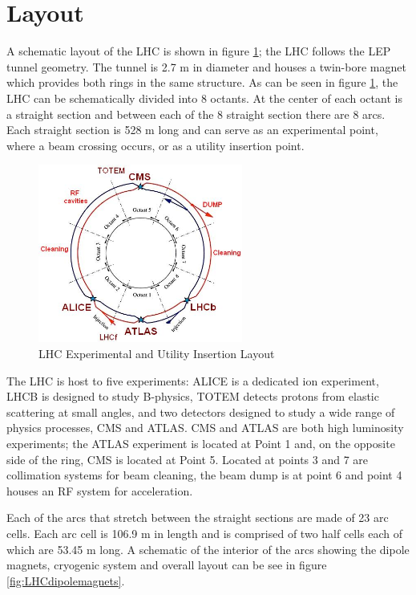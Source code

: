 \section{Layout}
A schematic layout of the LHC is shown in figure \ref{fig:LHCring};
the LHC follows the LEP tunnel geometry.
The tunnel is 2.7 m in diameter and houses a twin-bore magnet 
which provides both rings in the same structure.
As can be seen in figure \ref{fig:LHCring},
the LHC can be schematically divided 
into 8 octants. At the center of each octant is a straight section and between
each of the 8 straight section there are 8 arcs. Each straight section
is 528 m long and can serve as an experimental point, where a beam
crossing occurs, or as a utility insertion point.
\begin{figure}[t]
  \centering
	\includegraphics[width=0.6\textwidth]{images/LHCring.jpg}
  	\caption[LHCring]
   	{LHC Experimental and Utility Insertion Layout}
   \label{fig:LHCring}
\end{figure}
The LHC is host to five experiments: ALICE is a dedicated ion
experiment, LHCB is designed to study B-physics,
TOTEM detects protons from elastic scattering at small angles,
and two detectors designed to study a wide range of 
physics processes, CMS and ATLAS.
CMS and ATLAS are both high luminosity experiments;
the ATLAS experiment is located at Point 1 and, on the opposite side
of the ring, CMS is located at Point 5. 
Located at points 3 and 7 are collimation systems for beam cleaning,
the beam dump is at point 6 and point 4 houses an RF system for acceleration.

Each of the arcs that stretch between the straight sections
are made of 23 arc cells. Each arc cell is 106.9 m in length
and is comprised of two half cells each of which are 53.45 m long.
A schematic of the interior of the arcs showing the dipole magnets,
cryogenic system and overall layout can be see in figure \ref{fig:LHCdipolemagnets}.

